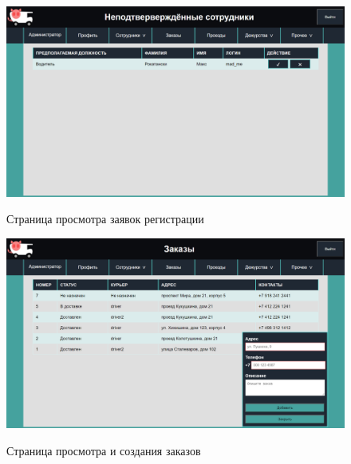 \begin{figure}[h!] 
	\begin{center}
		{\includegraphics[scale=0.43, angle=0]{sc/unver}}
		\caption{Страница просмотра заявок регистрации}
		\label{unver_sc}
	\end{center}
\end{figure}

\begin{figure}[h!] 
	\begin{center}
		{\includegraphics[scale=0.43, angle=0]{sc/all_delivery}}
		\caption{Страница просмотра и создания заказов}
		\label{all_delivery_sc}
	\end{center}
\end{figure}

